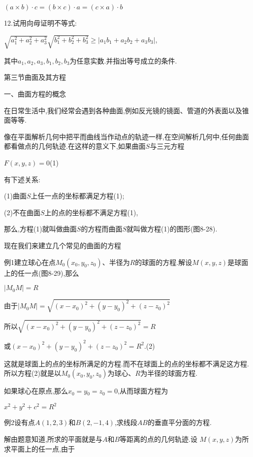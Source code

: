\documentclass[oneside]{book}
\begin{document}
$(a \times b) \cdot c = \left( {b \times c} \right) \cdot a = \left( {c \times a} \right) \cdot b$

12.试用向毋证明不等式:

$\sqrt {a_1^2 + a_2^2 + a_3^2} \sqrt {b_1^2 + b_2^2 + b_3^2}  \geqslant |{a_1}{b_1} + {a_2}{b_2} + {a_3}{b_3}|$,

其中${a_1},{a_2},{a_3},{b_1},{b_2},{b_3}$为任意实数.并指出等号成立的条件.

第三节曲面及其方程

一、曲面方程的概念

在日常生活中,我们经常会遇到各种曲面,例如反光镜的镜面、管道的外表面以及锥面等等.

像在平面解析几何中把平而曲线当作动点的轨迹一样,在空间解析几何中,任何曲面都看做点的几何轨迹.在这样的意义下,如果曲面$S$与三元方程

$F\left( {x,y,z} \right) = 0$\quad (1)

有下述关系:

(1)曲面$S$上任一点的坐标都满足方程(1);

(2)不在曲面$S$上的点的坐标都不满足方程(1),

那么,方程(1)就叫做曲面$S$的方程而曲面$S$就叫做方程(1)的图形(图8-28).

现在我们来建立几个常见的曲面的方程

例1建立球心在点${M_0}(x{_0},{y_0},{z_0})$、半径为$R$的球面的方程.解设$M(x,y,z)$是球面上的任一点(图8-29),那么

$|{M_0}M| = R$

由于$\left| {{M_0}M} \right| = \sqrt {{{\left( {x - {x_0}} \right)}^2} + {{\left( {y - {y_0}} \right)}^2} + {{\left( {z - {z_0}} \right)}^2}} $

所以$\sqrt {{{\left( {x - {x_0}} \right)}^2} + {{\left( {y - {y_0}} \right)}^2} + {{\left( {z - {z_0}} \right)}^2}}=R$

或${(x - {x_0})^2} + {\left( {y - {y_0}} \right)^2} + {(z - {z_0})^2} = {R^2}$.(2)

这就是球面上的点的坐标所满足的方程.而不在球面上的点的坐标都不满足这方程.所以方程(2)就是以${M_0}({x_0},{y_0},{z_0})$为球心、$R$为半径的球面方程.

如果球心在原点,那么${x_0} = y{_0} = {z_0} = 0$,从而球面方程为

${x^2} + {y^2} + {c^2} = {R^2}$

例2设有点$A(1,2,3)$和$B(2,-1,4)$,求线段$AB$的垂直平分面的方程.

解由题意知道,所求的平面就是与$A$和$B$等距离的点的几何轨迹.设
$M(x,y,z)$为所求平面上的任一点,由于
\end{document}
